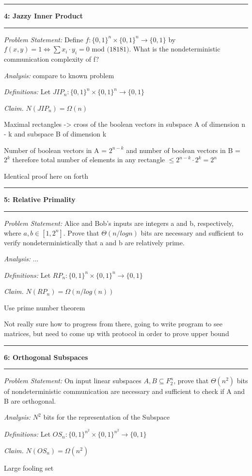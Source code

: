 \documentclass[11pt]{article}
\newcommand\question[2]{\vspace{.25in}\hrule\textbf{#1: #2}\vspace{.5em}\hrule\vspace{.10in}}
\newcommand\analysis{\vspace{.10in}\emph{Analysis: }\newline}
\newcommand\problem{\emph{Problem Statement:}\newline}
\newcommand\definitions{\emph{Definitions:}\newline}
\newcommand\claim{\emph{Claim.}\newline}
\begin{document}
\question{4}{Jazzy Inner Product}

\problem
Define $f: {\{0, 1\}}^n \times {\{0, 1\}}^n \to \{0, 1\}$ by $f(x, y) = 1 \iff \sum{x_i \cdot y_i} = 0 \text{ mod (18181)}.$ What is the nondeterministic communication complexity of f?

\analysis
compare to known problem 

\definitions
Let $JIP_n: {\{0, 1\}}^n \times {\{0, 1\}}^n \to \{0, 1\}$

\claim
$N(JIP_n) = \Omega(n)$ 

\proof 
Maximal rectangles -> cross of the boolean vectors in subspace A of dimension n - k and subspace B of dimension k 

Number of boolean vectors in A = $2^{n - k}$ and number of boolean vectors in B = $2^{k}$ therefore total number of elements in any rectangle $\leq 2^{n - k} \cdot 2^{k} = 2^n$ 

Identical proof here on forth

\newpage

\question{5}{Relative Primality}

\problem
Alice and Bob’s inputs are integers a and b, respectively, where $a, b \in [1, 2^n]$. Prove that $\Theta(n/ log n)$ bits are necessary and sufficient to verify nondeterministically that a and b are relatively prime.

\analysis
... 

\definitions
Let $RP_n: {\{0, 1\}}^n \times {\{0, 1\}}^n \to \{0, 1\}$

\claim
$N(RP_n) = \Omega(n/log(n))$ 

\proof 
Use prime number theorem

Not really sure how to progress from there, going to write program to see matrices, but need to come up with protocol in order to prove upper bound

\newpage

\question{6}{Orthogonal Subspaces}

\problem
On input linear subspaces $A, B \subseteq F^n_2$, prove that $\Theta(n^2)$ bits of nondeterministic communication are necessary and sufficient to check if A and B are orthogonal.

\analysis
$N^2$ bits for the representation of the Subspace

\definitions
Let $OS_n: {\{0, 1\}}^{n^2} \times {\{0, 1\}}^{n^2} \to \{0, 1\}$

\claim
$N(OS_n) = \Omega(n^2)$ 

\proof 
Large fooling set
\end{document}
